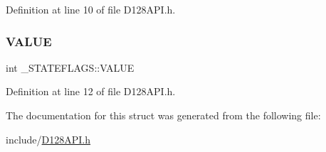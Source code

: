 Definition at line 10 of file D128\+A\+P\+I.\+h.

\mbox{\label{struct___s_t_a_t_e_f_l_a_g_s_aeafe01c8bbda4ee95f71c151ecc948b7}} 
\subsubsection{\texorpdfstring{V\+A\+L\+UE}{VALUE}}
{\footnotesize\ttfamily int \+\_\+\+S\+T\+A\+T\+E\+F\+L\+A\+G\+S\+::\+V\+A\+L\+UE}



Definition at line 12 of file D128\+A\+P\+I.\+h.



The documentation for this struct was generated from the following file\+:\begin{DoxyCompactItemize}
\item 
include/\hyperlink{_d128_a_p_i_8h}{D128\+A\+P\+I.\+h}\end{DoxyCompactItemize}

